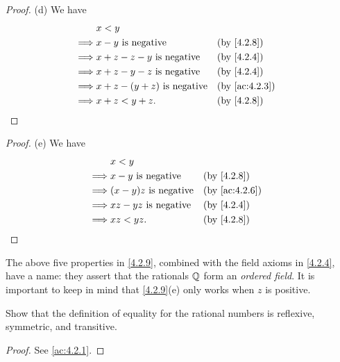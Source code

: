 \begin{proof}{(d)}
  We have
  \begin{align*}
             & x < y                                                                \\
    \implies & x - y \text{ is negative}           &  & \text{(by \cref{4.2.8})}    \\
    \implies & x + z - z - y \text{ is negative}   &  & \text{(by \cref{4.2.4})}    \\
    \implies & x + z - y - z \text{ is negative}   &  & \text{(by \cref{4.2.4})}    \\
    \implies & x + z - (y + z) \text{ is negative} &  & \text{(by \cref{ac:4.2.3})} \\
    \implies & x + z < y + z.                      &  & \text{(by \cref{4.2.8})}
  \end{align*}
\end{proof}

\begin{proof}{(e)}
  We have
  \begin{align*}
             & x < y                                                         \\
    \implies & x - y \text{ is negative}    &  & \text{(by \cref{4.2.8})}    \\
    \implies & (x - y)z \text{ is negative} &  & \text{(by \cref{ac:4.2.6})} \\
    \implies & xz - yz \text{ is negative}  &  & \text{(by \cref{4.2.4})}    \\
    \implies & xz < yz.                     &  & \text{(by \cref{4.2.8})}
  \end{align*}
\end{proof}

\begin{rmk}\label{4.2.10}
  The above five properties in \cref{4.2.9}, combined with the field axioms in \cref{4.2.4}, have a name:
  they assert that the rationals \(\mathbb{Q}\) form an \emph{ordered field}.
  It is important to keep in mind that \cref{4.2.9}(e) only works when \(z\) is positive.
\end{rmk}

\exercisesection

\begin{ex}\label{ex:4.2.1}
  Show that the definition of equality for the rational numbers is reflexive, symmetric, and transitive.
\end{ex}

\begin{proof}
  See \cref{ac:4.2.1}.
\end{proof}

